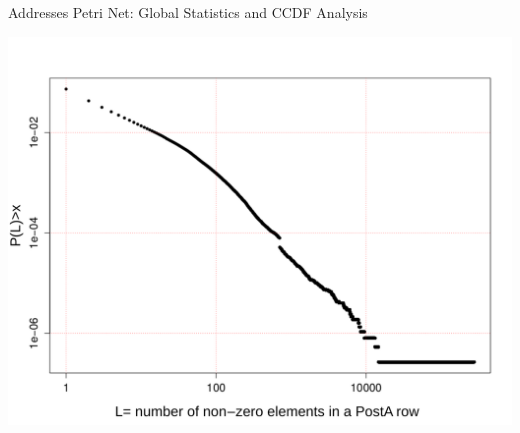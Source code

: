 \documentclass{beamer}
\begin{document}
\begin{frame}{Addresses Petri Net: Global Statistics and CCDF Analysis}
\begin{minipage}[c]{0.45\textwidth}
        \includegraphics[width=0.95\linewidth]{PostA}
        \footnotesize
        \label{fig_postA_CCDF}
    \end{minipage}
\end{frame}
\end{document}
